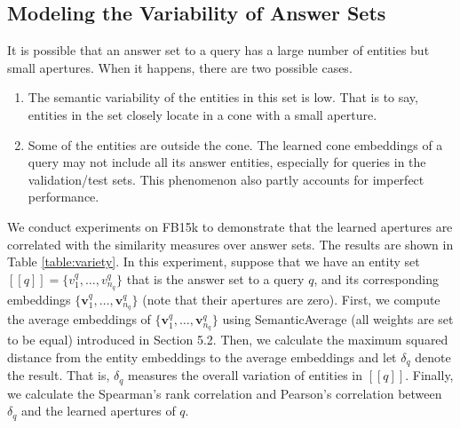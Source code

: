 \documentclass{article}
\begin{document}
\subsection{Modeling the Variability of Answer Sets}
It is possible that an answer set to a query has a large number of entities but small apertures. When it happens, there are two possible cases.
\begin{enumerate}
    \item The semantic variability of the entities in this set is low. That is to say, entities in the set closely locate in a cone with a small aperture.
    \item Some of the entities are outside the cone. The learned cone embeddings of a query may not include all its answer entities, especially for queries in the validation/test sets. This phenomenon also partly accounts for imperfect performance.
\end{enumerate}

We conduct experiments on FB15k to demonstrate that the learned apertures are correlated with the similarity measures over answer sets. The results are shown in Table \ref{table:variety}. In this experiment, suppose that we have an entity set $[[q]]=\{v_1^q, \dots, v_{n_q}^q\}$ that is the answer set to a query $q$,  and its corresponding embeddings $\{\textbf{v}_1^q,\dots,\textbf{v}_{n_q}^q\}$ (note that their apertures are zero). First, we compute the average embeddings of $\{\textbf{v}_1^q,\dots,\textbf{v}_{n_q}^q\}$ using SemanticAverage (all weights are set to be equal) introduced in Section 5.2. Then, we calculate the maximum squared distance from the entity embeddings to the average embeddings and let $\delta_q$ denote the result. That is, $\delta_q$ measures the overall variation of entities in $[[q]]$. Finally, we calculate the Spearman’s rank correlation and Pearson’s correlation between $\delta_q$ and the learned apertures of $q$.


\begin{table}[ht]
    \centering
    \caption{Spearman's rank correlation (SRC) and Pearson's correlation (PC) between learned aperture embeddings and the variety of answer sets on FB15k.}
    \label{table:variety}
    \vspace{1mm}
    \vspace{-1mm}
\end{table}
\end{document}
